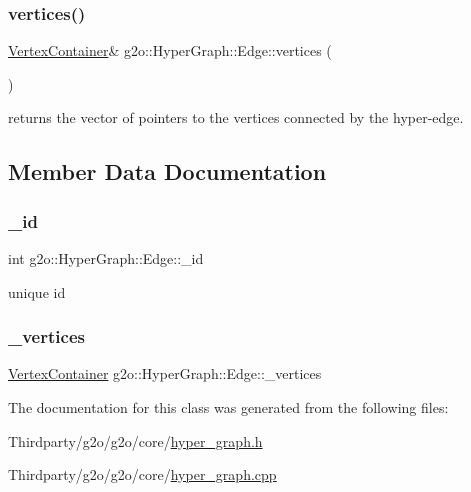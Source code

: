 \subsubsection{\texorpdfstring{vertices()}{vertices()}\hspace{0.1cm}{\footnotesize\ttfamily [2/2]}}
{\footnotesize\ttfamily \mbox{\hyperlink{classg2o_1_1_hyper_graph_a9339534c99300a0ddac87ba976ef188c}{Vertex\+Container}}\& g2o\+::\+Hyper\+Graph\+::\+Edge\+::vertices (\begin{DoxyParamCaption}{ }\end{DoxyParamCaption})\hspace{0.3cm}{\ttfamily [inline]}}

returns the vector of pointers to the vertices connected by the hyper-\/edge. 

\subsection{Member Data Documentation}
\mbox{\label{classg2o_1_1_hyper_graph_1_1_edge_aa1b6978624f7c165a4e0461cb5ff18fa}} 
\subsubsection{\texorpdfstring{\+\_\+id}{\_id}}
{\footnotesize\ttfamily int g2o\+::\+Hyper\+Graph\+::\+Edge\+::\+\_\+id\hspace{0.3cm}{\ttfamily [protected]}}



unique id 

\mbox{\label{classg2o_1_1_hyper_graph_1_1_edge_aabb036d331fc7f2524ec8611b638de92}} 
\subsubsection{\texorpdfstring{\+\_\+vertices}{\_vertices}}
{\footnotesize\ttfamily \mbox{\hyperlink{classg2o_1_1_hyper_graph_a9339534c99300a0ddac87ba976ef188c}{Vertex\+Container}} g2o\+::\+Hyper\+Graph\+::\+Edge\+::\+\_\+vertices\hspace{0.3cm}{\ttfamily [protected]}}



The documentation for this class was generated from the following files\+:\begin{DoxyCompactItemize}
\item 
Thirdparty/g2o/g2o/core/\mbox{\hyperlink{hyper__graph_8h}{hyper\+\_\+graph.\+h}}\item 
Thirdparty/g2o/g2o/core/\mbox{\hyperlink{hyper__graph_8cpp}{hyper\+\_\+graph.\+cpp}}\end{DoxyCompactItemize}
